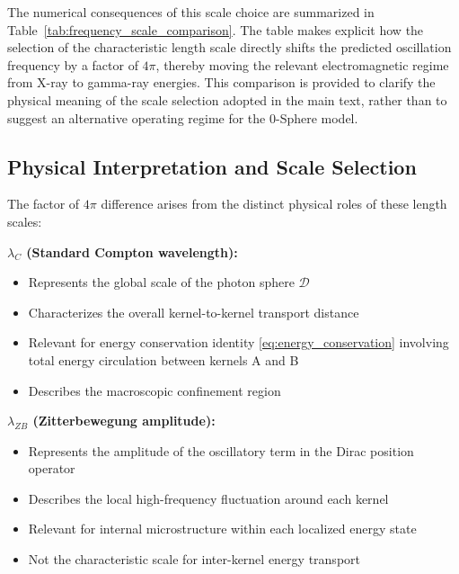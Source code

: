 \documentclass[%
 reprint,
 amsmath,amssymb,
 aps,
 prb,
]{revtex4-2}
\numberwithin{equation}{section}
\begin{document}
The numerical consequences of this scale choice are summarized in Table~\ref{tab:frequency_scale_comparison}.
The table makes explicit how the selection of the characteristic length scale directly shifts the predicted oscillation frequency by a factor of $4\pi$, thereby moving the relevant electromagnetic regime from X-ray to gamma-ray energies.
This comparison is provided to clarify the physical meaning of the scale selection adopted in the main text, rather than to suggest an alternative operating regime for the 0-Sphere model.


\subsection{Physical Interpretation and Scale Selection}

The factor of $4\pi$ difference arises from the distinct physical roles of these length scales:

\medskip
\noindent\textbf{$\lambda_C$ (Standard Compton wavelength):}
\begin{itemize}
\item Represents the global scale of the photon sphere $\mathcal{D}$
\item Characterizes the overall kernel-to-kernel transport distance
\item Relevant for energy conservation identity \eqref{eq:energy_conservation} involving total energy circulation between kernels A and B
\item Describes the macroscopic confinement region
\end{itemize}

\medskip
\noindent\textbf{$\lambda_{ZB}$ (Zitterbewegung amplitude):}
\begin{itemize}
\item Represents the amplitude of the oscillatory term in the Dirac position operator
\item Describes the local high-frequency fluctuation around each kernel
\item Relevant for internal microstructure within each localized energy state
\item Not the characteristic scale for inter-kernel energy transport
\end{itemize}

\end{document}
